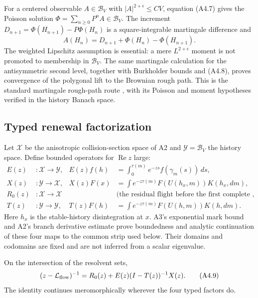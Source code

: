 For a centered observable $A\in\mathcal B_V$ with
$|A|^{2+\epsilon}\le CV$, equation (A4.7) gives the Poisson solution
$\Phi=\sum_{n\ge0}P^nA\in\mathcal B_V$.  The increment
$D_{n+1}=\Phi(H_{n+1})-P\Phi(H_n)$ is a square-integrable martingale
difference and
\[
 A(H_n)=D_{n+1}+\Phi(H_n)-\Phi(H_{n+1}).                  \tag{A4.8}
\]
The weighted Lipschitz assumption is essential: a mere
$L^{2+\epsilon}$ moment is not promoted to membership in $\mathcal B_V$.
The same martingale calculation for the antisymmetric second level, together
with Burkholder bounds and (A4.8), proves convergence of the polygonal lift to
the Brownian rough path.  This is the standard martingale rough-path route
\cite{FrizHairer2014}, with its Poisson and moment hypotheses verified in the
history Banach space.

\subsection{Typed renewal factorization}

Let $\mathcal X$ be the anisotropic collision-section space of A2 and
$\mathcal Y=\mathcal B_V$ the history space.  Define bounded operators for
$\operatorname{Re}z$ large:
\begin{align*}
 E(z)&:\mathcal X\to\mathcal Y,
 &E(z)f(h)&=\int_0^{\tau(m)}e^{-zs}f(\gamma_m(s))\,ds,\\
 X(z)&:\mathcal Y\to\mathcal X,
 &X(z)F(x)&=\int e^{-z\tau(m)}F(U(h_x,m))K(h_x,dm),\\
 R_0(z)&:\mathcal X\to\mathcal X
 &&\text{(the residual flight before the first complete return)},\\
 T(z)&:\mathcal Y\to\mathcal Y,
 &T(z)F(h)&=\int e^{-z\tau(m)}F(U(h,m))K(h,dm).
\end{align*}
Here $h_x$ is the stable-history disintegration at $x$.  A3's exponential
mark bound and A2's branch derivative estimate prove boundedness and analytic
continuation of these four maps to the common strip used below.  Their domains
and codomains are fixed and are not inferred from a scalar eigenvalue.

\begin{proposition}
\label{prop:r23-a4-renewal}
On the intersection of the resolvent sets,
\[
 (z-\mathcal L_{\rm flow})^{-1}
 =R_0(z)+E(z)(I-T(z))^{-1}X(z).                           \tag{A4.9}
\]
The identity continues meromorphically wherever the four typed factors do.
\end{proposition}

